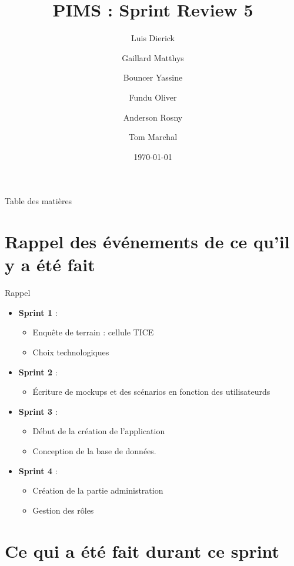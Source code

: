 \documentclass[numbering=fraction]{beamer}
\title{PIMS : Sprint Review 5}
\author[PIMS]{Luis Dierick \and Gaillard Matthys \and Bouncer Yassine \and Fundu Oliver \and Anderson Rosny \and Tom Marchal }
\institute{Université de Namur}
\date{\today}
\begin{document}
\begin{frame}[plain]{}
    \maketitle
\end{frame}

\begin{frame}{Table des matières}
    \tableofcontents
\end{frame}
\section{Rappel des événements de ce qu'il y a été fait}
\begin{frame}{Rappel}
    \begin{itemize}
        \item \textbf{Sprint 1} :
        \begin{itemize}
            \item Enquête de terrain : cellule TICE 
            \item Choix technologiques
        \end{itemize}
        \item \textbf{Sprint 2} : 
        \begin{itemize}
            \item Écriture de mockups et des scénarios en fonction des utilisateurds
        \end{itemize}
        \item \textbf{Sprint 3} :
        \begin{itemize}
            \item Début de la création de l'application
            \item Conception de la base de données.
        \end{itemize}
        \item \textbf{Sprint 4} :
        \begin{itemize}
            \item Création de la partie administration
            \item Gestion des rôles
        \end{itemize}
            
    \end{itemize}
\end{frame}
\section{Ce qui a été fait durant ce sprint}
\end{document}
